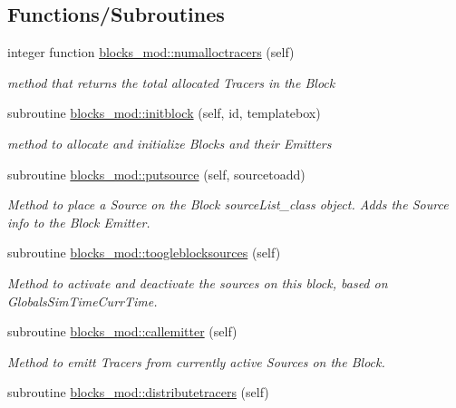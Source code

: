 \subsection*{Functions/\+Subroutines}
\begin{DoxyCompactItemize}
\item 
integer function \mbox{\hyperlink{namespaceblocks__mod_a7202fad0fdc07ff9111e61e3aa513af9}{blocks\+\_\+mod\+::numalloctracers}} (self)
\begin{DoxyCompactList}\small\item\em method that returns the total allocated Tracers in the Block \end{DoxyCompactList}\item 
subroutine \mbox{\hyperlink{namespaceblocks__mod_a534ca69b17b6f54ee07f995b02feff39}{blocks\+\_\+mod\+::initblock}} (self, id, templatebox)
\begin{DoxyCompactList}\small\item\em method to allocate and initialize Blocks and their Emitters \end{DoxyCompactList}\item 
subroutine \mbox{\hyperlink{namespaceblocks__mod_ae3bd1bfeee831f4b41932839495bb108}{blocks\+\_\+mod\+::putsource}} (self, sourcetoadd)
\begin{DoxyCompactList}\small\item\em Method to place a Source on the Block source\+List\+\_\+class object. Adds the Source info to the Block Emitter. \end{DoxyCompactList}\item 
subroutine \mbox{\hyperlink{namespaceblocks__mod_ab9e57cbf0103b632b2b2dfa4e4d4139c}{blocks\+\_\+mod\+::toogleblocksources}} (self)
\begin{DoxyCompactList}\small\item\em Method to activate and deactivate the sources on this block, based on GlobalsSim\+TimeCurr\+Time. \end{DoxyCompactList}\item 
subroutine \mbox{\hyperlink{namespaceblocks__mod_a2c3cf5113e1422d812c2c869afde2729}{blocks\+\_\+mod\+::callemitter}} (self)
\begin{DoxyCompactList}\small\item\em Method to emitt Tracers from currently active Sources on the Block. \end{DoxyCompactList}\item 
subroutine \mbox{\hyperlink{namespaceblocks__mod_aa178415bcc40cf169744d356e1a09c6b}{blocks\+\_\+mod\+::distributetracers}} (self)

\end{DoxyCompactItemize}
